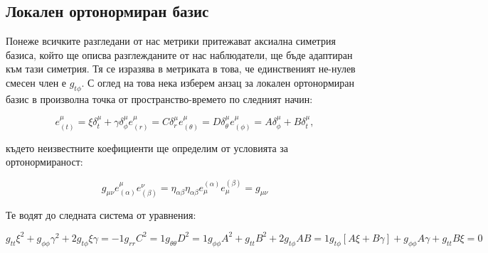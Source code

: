 \begin{appendices}
	
	\section{Локален ортонормиран базис}
	
	Понеже всичките разгледани от нас метрики притежават аксиална симетрия базиса, който ще описва разглежданите от нас наблюдатели, ще бъде адаптиран към тази симетрия. Тя се изразява в метриката в това, че единственият не-нулев смесен член е $g_{t\phi}$. С оглед на това нека изберем анзац за локален ортонормиран базис в произволна точка от пространство-времето по следният начин:
	
	\begin{subequations}
		\begin{equation}
			e_{(t)}^\mu = \xi\delta_t^\mu + \gamma\delta_\phi^\mu
		\end{equation}
		\begin{equation}
			e_{(r)}^\mu = C\delta_r^\mu
		\end{equation}
		\begin{equation}
			e_{(\theta)}^\mu = D\delta_\theta^\mu
		\end{equation}
		\begin{equation}
			e_{(\phi)}^\mu = A\delta_\phi^\mu + B\delta_t^\mu,
		\end{equation}
	\end{subequations}
	
	където неизвестните коефициенти ще определим от условията за ортонормираност:
	
	\begin{subequations}
		\begin{equation}
			g_{\mu\nu}e^\mu_{(\alpha)}e^\nu_{(\beta)} = \eta_{\alpha\beta}
		\end{equation}
		\begin{equation}
			\eta_{\alpha\beta}e^{(\alpha)}_\mu e^{(\beta)}_\mu = g_{\mu\nu}
		\end{equation}
	\end{subequations}
	
	Те водят до следната система от уравнения:
	
	\begin{subequations}
		\begin{equation}
			g_{tt}\xi^2 + g_{\phi\phi}\gamma^2 + 2g_{t\phi}\xi\gamma = -1
		\end{equation}
		\begin{equation}
			g_{rr}C^2 = 1
		\end{equation}
		\begin{equation}
			g_{\theta\theta}D^2 = 1
		\end{equation}
		\begin{equation}
			g_{\phi\phi}A^2 + g_{tt}B^2 + 2g_{t\phi}AB = 1
		\end{equation}
		\begin{equation}
			g_{t\phi}\left[ A\xi + B\gamma \right] + g_{\phi\phi}A\gamma + g_{tt}B\xi = 0
		\end{equation}
	\end{subequations}
	

\end{appendices}
